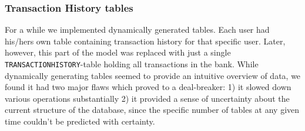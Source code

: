 \subsubsection{Transaction History tables}
For a while we implemented dynamically generated tables. Each user had his/hers own table containing transaction history for that specific user. Later, however, this part of the model was replaced with just a single \texttt{TRANSACTIONHISTORY}-table holding all transactions in the bank. While dynamically generating tables seemed to provide an intuitive overview of data, we found it had two major flaws which proved to a deal-breaker: 1) it slowed down various operations substantially 2) it provided a sense of uncertainty about the current structure of the database, since the specific number of tables at any given time couldn't be predicted with certainty. 
             